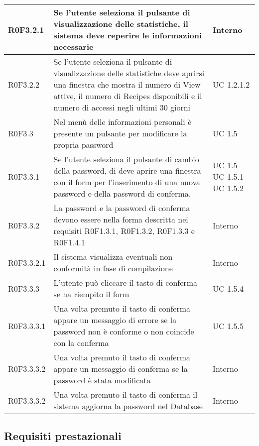 \begin{center}
\begin{longtable}{| p{2cm} | p{7cm} | p{2cm} |}
		R0F3.2.1  &  Se l'utente seleziona il pulsante di visualizzazione delle statistiche, il sistema deve reperire le informazioni necessarie  &  Interno \\
		\hline
		R0F3.2.2  &  Se l'utente seleziona il pulsante di visualizzazione delle statistiche deve aprirsi una finestra che mostra il numero di View attive, il numero di Recipes disponibili e il numero di accessi negli ultimi 30 giorni &  UC 1.2.1.2 \\
		\hline
		R0F3.3  &  Nel menù delle informazioni personali è presente un pulsante per modificare la propria password &  UC 1.5 \\
		\hline
		R0F3.3.1  &  Se l'utente seleziona il pulsante di cambio della password, di deve aprire una finestra con il form per l'inserimento di una nuova password e della password di conferma. &  UC 1.5 \newline UC 1.5.1 \newline UC 1.5.2 \\
		\hline
		R0F3.3.2  &  La password e la password di conferma devono essere nella forma descritta nei requisiti R0F1.3.1, R0F1.3.2, R0F1.3.3 e R0F1.4.1  &  Interno \\
		\hline
		R0F3.3.2.1  &  Il sistema visualizza eventuali non conformità in fase di compilazione  &  Interno \\
		\hline
		R0F3.3.3  &  L'utente può cliccare il tasto di conferma se ha riempito il form  &  UC 1.5.4 \\
		\hline
		R0F3.3.3.1  &  Una volta premuto il tasto di conferma appare un messaggio di errore se la password non è conforme o non coincide con la conferma  & UC 1.5.5 \\
		\hline
		R0F3.3.3.2  &  Una volta premuto il tasto di conferma appare un messaggio di conferma se la password è stata modificata  &  Interno \\
		\hline
		R0F3.3.3.2  &  Una volta premuto il tasto di conferma il sistema aggiorna la password nel Database  &  Interno \\
		\hline

	\end{longtable}
	\egroup
\end{center}


\subsection{Requisiti prestazionali}

